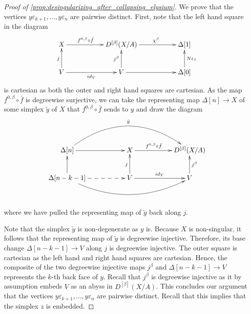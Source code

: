 \begin{proof}[Proof of \cref{prop:desingularizing_after_collapsing_elysium}]
We prove that the vertices $y\varepsilon _{k+1} ,\dots ,y\varepsilon _n$ are pairwise distinct. First, note that the left hand square in the diagram
\begin{displaymath}
\xymatrix{
X \ar[rr]^(.4){f^{0,\beta } \circ \bar{f} } && D^{[\beta ]}(X/A) \ar[rr]^(.55){\chi ^\beta } && \Delta [1] \\
V \ar[u]^j \ar[rr]_{id_V} && V \ar[u]^{j^\beta } \ar[rr] && \Delta [0] \ar[u]_{N\varepsilon _1}
}
\end{displaymath}
is cartesian as both the outer and right hand squares are cartesian. As the map $f^{0,\beta } \circ \bar{f}$ is degreewise surjective, we can take the representing map $\Delta [n]\to X$ of some simplex $\tilde{y}$ of $X$ that $f^{0,\beta } \circ \bar{f}$ sends to $y$ and draw the diagram
\begin{displaymath}
\xymatrix{
\Delta [n] \ar[rr] \ar@/^3pc/[rrrr]^{\bar{y} } && X \ar[rr]^(.4){f^{0,\beta } \circ \bar{f} } && D^{[\beta ]}(X/A) \\
\Delta [n-k-1] \ar[u] \ar@{-->}[rr] \ar@/_2pc/[rrrr] && V \ar[u]^j \ar[rr]^{id_V} && V \ar[u]_{j^\beta }
}
\end{displaymath}
\\ \\
where we have pulled the representing map of $\tilde{y}$ back along $j$.

Note that the simplex $\tilde{y}$ is non-degenerate as $y$ is. Because $X$ is non-singular, it follows that the representing map of $\tilde{y}$ is degreewise injective. Therefore, its base change $\Delta [n-k-1]\to V$ along $j$ is degreewise injective. The outer square is cartesian as the left hand and right hand squares are cartesian. Hence, the composite of the two degreewise injective maps $j^\beta$ and $\Delta [n-k-1]\to V$ represents the $k$-th back face of $y$. Recall that $j^\beta$ is degreewise injective as it by assumption embeds $V$ as an abyss in $D^{[\beta ]}(X/A)$. This concludes our argument that the vertices $y\varepsilon _{k+1} ,\dots ,y\varepsilon _n$ are pairwise distinct. Recall that this implies that the simplex $z$ is embedded.


\end{proof}
